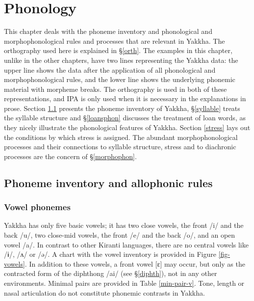 ﻿\chapter{Phonology}\label{phon}


This chapter deals with the phoneme inventory and phonological  and morpho\-phonological rules and processes that are relevant in Yakkha. The orthography used here is explained  in §\ref{orth}. The examples in this chapter, unlike in the other chapters, have two lines representing the Yakkha data: the upper line shows the data after the application of all phonological and morphophonological rules, and the lower line shows the underlying phonemic material with morpheme breaks. The orthography is used in both of these representations, and IPA is only used when it is necessary in the explanations in prose. Section \ref{phon-inv} presents the phoneme inventory of Yakkha,   §\ref{syllable} treats the syllable structure and  §\ref{loansphon} discusses the treatment of loan words, as they nicely illustrate the phonological features of Yakkha. Section \ref{stress} lays out the conditions by which stress is assigned. The abundant morphophonological processes and their connections to syllable structure, stress and to diachronic processes are the concern of §\ref{morphophon}. 


\section{Phoneme inventory and allophonic rules}\label{phon-inv}

\subsection{Vowel phonemes}\label{vowelphon}

Yakkha has only five basic vowels; it has two close vowels, the front /i/ and the back /u/, two close-mid vowels, the front /e/ and the back /o/, and an open vowel /a/. In contrast to other Kiranti languages,  there are no central vowels like  /ɨ/, /ʌ/ or /ə/. A chart with the vowel inventory is provided in Figure \ref{fig-vowels}. In addition to these vowels, a  front vowel [ɛ] may occur, but only as the  contracted form of the diphthong /ai/ (see §\ref{diphth}), not in any other environments. Minimal pairs are provided in Table  \ref{min-pair-v}. Tone, length or nasal articulation do not constitute phonemic contrasts in Yakkha. 



